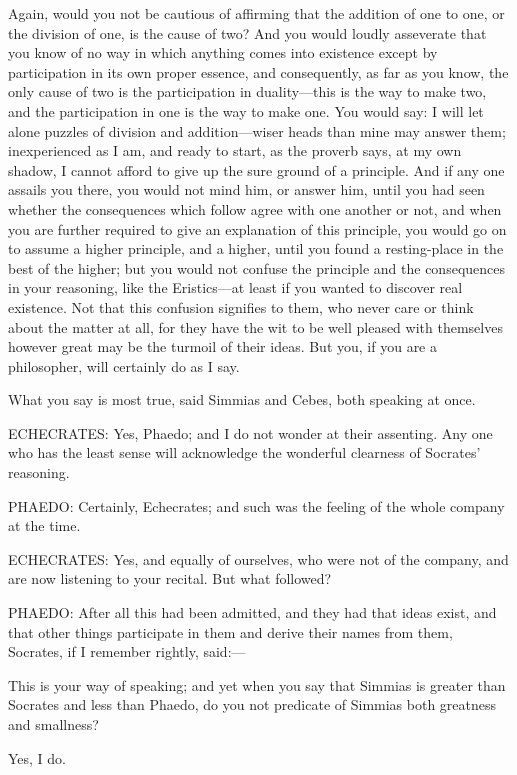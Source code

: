 Again, would you not be cautious of affirming that the addition of one to
one, or the division of one, is the cause of two? And you would loudly
asseverate that you know of no way in which anything comes into existence
except by participation in its own proper essence, and consequently, as
far as you know, the only cause of two is the participation in duality—this
is the way to make two, and the participation in one is the way to make
one. You would say: I will let alone puzzles of division and addition—wiser
heads than mine may answer them; inexperienced as I am, and ready to
start, as the proverb says, at my own shadow, I cannot afford to give up
the sure ground of a principle. And if any one assails you there, you
would not mind him, or answer him, until you had seen whether the
consequences which follow agree with one another or not, and when you are
further required to give an explanation of this principle, you would go on
to assume a higher principle, and a higher, until you found a
resting-place in the best of the higher; but you would not confuse the
principle and the consequences in your reasoning, like the Eristics—at
least if you wanted to discover real existence. Not that this confusion
signifies to them, who never care or think about the matter at all, for
they have the wit to be well pleased with themselves however great may be
the turmoil of their ideas. But you, if you are a philosopher, will
certainly do as I say.

What you say is most true, said Simmias and Cebes, both speaking at once.

ECHECRATES: Yes, Phaedo; and I do not wonder at their assenting. Any one
who has the least sense will acknowledge the wonderful clearness of
Socrates' reasoning.

PHAEDO: Certainly, Echecrates; and such was the feeling of the whole
company at the time.

ECHECRATES: Yes, and equally of ourselves, who were not of the company,
and are now listening to your recital. But what followed?

PHAEDO: After all this had been admitted, and they had that ideas exist,
and that other things participate in them and derive their names from
them, Socrates, if I remember rightly, said:—

This is your way of speaking; and yet when you say that Simmias is greater
than Socrates and less than Phaedo, do you not predicate of Simmias both
greatness and smallness?

Yes, I do.

